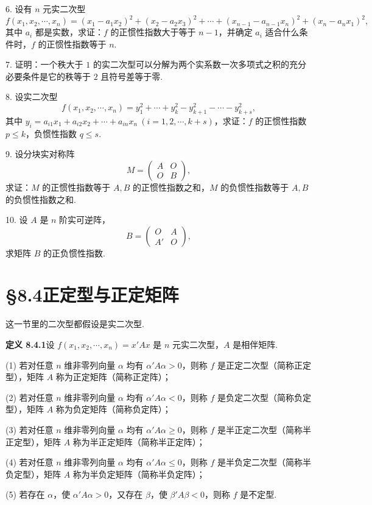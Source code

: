 \documentclass[UTF8, 12pt, fontset=fandol, oneside]{ctexart}
\begin{document}
6. 设有 $n$ 元实二次型
\[
f(x_1,x_2,\cdots,x_n)=(x_1-a_1x_2)^2+(x_2-a_2x_3)^2+\cdots+(x_{n-1}-a_{n-1}x_n)^2+(x_n-a_nx_1)^2,
\]
其中 $a_i$ 都是实数，求证：$f$ 的正惯性指数大于等于 $n-1$，并确定 $a_i$ 适合什么条件时，$f$ 的正惯性指数等于 $n$.

7. 证明：一个秩大于 $1$ 的实二次型可以分解为两个实系数一次多项式之积的充分必要条件是它的秩等于 $2$ 且符号差等于零.

8. 设实二次型
\[
f(x_1,x_2,\cdots,x_n)=y_1^2+\cdots+y_k^2-y_{k+1}^2-\cdots-y_{k+s}^2,
\]
其中 $y_i=a_{i1}x_1+a_{i2}x_2+\cdots+a_{in}x_n\ (i=1,2,\cdots,k+s)$，求证：$f$ 的正惯性指数 $p\leq k$，负惯性指数 $q\leq s$.

9. 设分块实对称阵
\[
M=\left(\begin{array}{cc}A&O\\ O&B\end{array}\right),
\]
求证：$M$ 的正惯性指数等于 $A,B$ 的正惯性指数之和，$M$ 的负惯性指数等于 $A,B$ 的负惯性指数之和.

10. 设 $A$ 是 $n$ 阶实可逆阵，
\[
B=\left(\begin{array}{cc}O&A\\ A'&O\end{array}\right),
\]
求矩阵 $B$ 的正负惯性指数.

\section*{§8.4\quad 正定型与正定矩阵}

这一节里的二次型都假设是实二次型.

\noindent\textbf{定义 8.4.1}\quad 设 $f(x_1,x_2,\cdots,x_n)=x'Ax$ 是 $n$ 元实二次型，$A$ 是相伴矩阵.

(1) 若对任意 $n$ 维非零列向量 $\alpha$ 均有 $\alpha'A\alpha>0$，则称 $f$ 是正定二次型（简称正定型），矩阵 $A$ 称为正定矩阵（简称正定阵）；

(2) 若对任意 $n$ 维非零列向量 $\alpha$ 均有 $\alpha'A\alpha<0$，则称 $f$ 是负定二次型（简称负定型），矩阵 $A$ 称为负定矩阵（简称负定阵）；

(3) 若对任意 $n$ 维非零列向量 $\alpha$ 均有 $\alpha'A\alpha\geq 0$，则称 $f$ 是半正定二次型（简称半正定型），矩阵 $A$ 称为半正定矩阵（简称半正定阵）；

(4) 若对任意 $n$ 维非零列向量 $\alpha$ 均有 $\alpha'A\alpha\leq 0$，则称 $f$ 是半负定二次型（简称半负定型），矩阵 $A$ 称为半负定矩阵（简称半负定阵）；

(5) 若存在 $\alpha$，使 $\alpha'A\alpha>0$，又存在 $\beta$，使 $\beta'A\beta<0$，则称 $f$ 是不定型.
\end{document}

